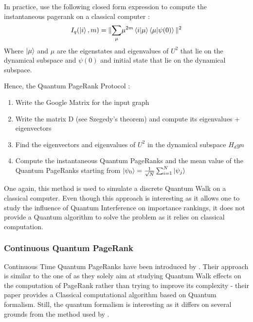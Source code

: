 \documentclass[sn-mathphys]{sn-jnl}%
\theoremstyle{thmstyleone}%
\theoremstyle{thmstyletwo}%
\theoremstyle{thmstylethree}%
\begin{document}
In practice, \cite{paparo_martin-delgado_2012} use the following
closed form expression to compute the instantaneous pagerank on a
classical computer :
\begin{equation*}
    I_q(\ket{i}, m) = \| \underset{\mu}{\sum} \mu^{2m} \braket{i|\mu} \braket{\mu|\psi(0)} \|^2
\end{equation*}
Where $\ket{\mu}$ and $\mu$ are the eigenstates and eigenvalues of
$U^2$ that lie on the dynamical subspace and $\psi(0)$ and initial
state that lie on the dynamical subspace.

Hence, the Quantum PageRank Protocol \cite{paparo_martin-delgado_2012}:
\begin{enumerate}
    \item Write the Google Matrix for the input graph
    \item Write the matrix D (see Szegedy's theorem) and compute its eigenvalues + eigenvectors
    \item Find the eigenvectors and eigenvalues of $U^2$ in the dynamical subspace $H_dyn$
    \item Compute the instantaneous Quantum PageRanks and the mean value of the Quantum PageRanks starting from $\ket{\psi_0} = \frac{1}{\sqrt{N}} \sum_{i=1}^N \ket{\psi_j}$
\end{enumerate}


One again, this method is used to simulate a discrete Quantum Walk on
a classical computer. Even though this approach is interesting as it
allows one to study the influence of Quantum Interference on
importance rankings, it does not provide a Quantum algorithm to solve
the problem as it relies on classical computation.

\subsubsection{Continuous Quantum PageRank}

Continuous Time Quantum PageRanks have been introduced by
\cite{sanchez-burillo_duch_gomez-gardenes_zueco_2012}. Their approach
is similar to the one of \cite{paparo_martin-delgado_2012} as they
solely aim at studying Quantum Walk effects on the computation of
PageRank rather than trying to improve its complexity - their paper
provides a Classical computational algorithm based on Quantum
formalism. Still, the quantum formalism is interesting as it differs
on several grounds from the method used by
\cite{paparo_martin-delgado_2012}.
\end{document}

